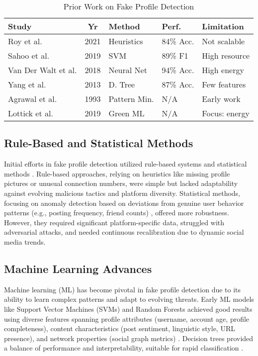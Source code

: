 \documentclass[conference]{IEEEtran}
\begin{document}
\begin{table}[htbp]
\small
\caption{Prior Work on Fake Profile Detection}
\begin{center}
\begin{tabular}{|l|c|l|l|l|}
\hline
\textbf{Study} & \textbf{Yr} & \textbf{Method} & \textbf{Perf.} & \textbf{Limitation} \\
\hline
Roy et al. \cite{b1} & 2021 & Heuristics & 84\% Acc. & Not scalable \\
Sahoo et al. \cite{b3} & 2019 & SVM & 89\% F1 & High resource \\
Van Der Walt et al. \cite{b6} & 2018 & Neural Net & 94\% Acc. & High energy \\
Yang et al. \cite{b7} & 2013 & D. Tree & 87\% Acc. & Few features \\
Agrawal et al. \cite{b10} & 1993 & Pattern Min. & N/A & Early work \\
Lottick et al. \cite{b11} & 2019 & Green ML & N/A & Focus: energy \\
\hline
\end{tabular}
\label{tab:lit}
\end{center}
\end{table}

\subsection{Rule-Based and Statistical Methods}
Initial efforts in fake profile detection utilized rule-based systems and statistical methods \cite{b1}. Rule-based approaches, relying on heuristics like missing profile pictures or unusual connection numbers, were simple but lacked adaptability against evolving malicious tactics and platform diversity. Statistical methods, focusing on anomaly detection based on deviations from genuine user behavior patterns (e.g., posting frequency, friend counts) \cite{b9}, offered more robustness. However, they required significant platform-specific data, struggled with adversarial attacks, and needed continuous recalibration due to dynamic social media trends.

\subsection{Machine Learning Advances}
Machine learning (ML) has become pivotal in fake profile detection due to its ability to learn complex patterns and adapt to evolving threats. Early ML models like Support Vector Machines (SVMs) and Random Forests achieved good results using diverse features spanning profile attributes (username, account age, profile completeness), content characteristics (post sentiment, linguistic style, URL presence), and network properties (social graph metrics) \cite{b3}. Decision trees provided a balance of performance and interpretability, suitable for rapid classification \cite{b7}.
\end{document}
